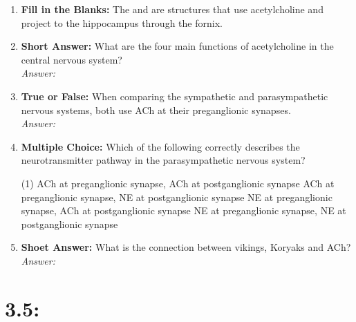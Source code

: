 \begin{enumerate}[label=\textbf{Q3.4.\arabic*}]
    \item \textbf{Fill in the Blanks:} The \underline{\hspace{3cm}} and \underline{\hspace{3cm}} are structures that use acetylcholine and project to the hippocampus through the fornix.

    \item \textbf{Short Answer:} What are the four main functions of acetylcholine in the central nervous system? \\
        \textit{Answer:} %

    \item \textbf{True or False:} When comparing the sympathetic and parasympathetic nervous systems, both use ACh at their preganglionic synapses. \\
        \textit{Answer:} %

    \item \textbf{Multiple Choice:} Which of the following correctly describes the neurotransmitter pathway in the parasympathetic nervous system?
        \begin{tasks}[label=\textcolor{\documentTheme}{(\Alph*)}, item-format=\color{\documentTheme}, label-width=1.5em, item-indent=1.7em](1)
            \task ACh at preganglionic synapse, ACh at postganglionic synapse
            \task ACh at preganglionic synapse, NE at postganglionic synapse
            \task NE at preganglionic synapse, ACh at postganglionic synapse
            \task NE at preganglionic synapse, NE at postganglionic synapse
        \end{tasks}

    \item \textbf{Shoet Answer:} What is the connection between vikings, Koryaks and ACh? \\
        \textit{Answer:} %
\end{enumerate}

\squigglyline
\section*{3.5: %
}

